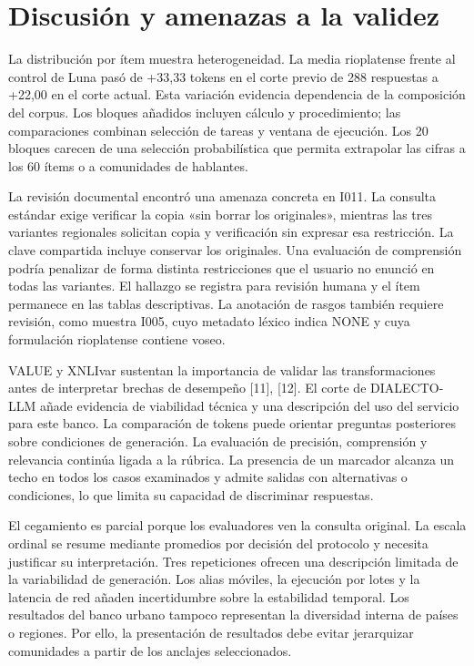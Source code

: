 \documentclass[conference]{IEEEtran}
\begin{document}
\section{Discusión y amenazas a la validez}
La distribución por ítem muestra heterogeneidad. La media rioplatense frente al control de Luna pasó de +33,33 tokens en el corte previo de 288 respuestas a +22,00 en el corte actual. Esta variación evidencia dependencia de la composición del corpus. Los bloques añadidos incluyen cálculo y procedimiento; las comparaciones combinan selección de tareas y ventana de ejecución. Los 20 bloques carecen de una selección probabilística que permita extrapolar las cifras a los 60 ítems o a comunidades de hablantes.

La revisión documental encontró una amenaza concreta en I011. La consulta estándar exige verificar la copia «sin borrar los originales», mientras las tres variantes regionales solicitan copia y verificación sin expresar esa restricción. La clave compartida incluye conservar los originales. Una evaluación de comprensión podría penalizar de forma distinta restricciones que el usuario no enunció en todas las variantes. El hallazgo se registra para revisión humana y el ítem permanece en las tablas descriptivas. La anotación de rasgos también requiere revisión, como muestra I005, cuyo metadato léxico indica NONE y cuya formulación rioplatense contiene voseo.

VALUE y XNLIvar sustentan la importancia de validar las transformaciones antes de interpretar brechas de desempeño [11], [12]. El corte de DIALECTO-LLM añade evidencia de viabilidad técnica y una descripción del uso del servicio para este banco. La comparación de tokens puede orientar preguntas posteriores sobre condiciones de generación. La evaluación de precisión, comprensión y relevancia continúa ligada a la rúbrica. La presencia de un marcador alcanza un techo en todos los casos examinados y admite salidas con alternativas o condiciones, lo que limita su capacidad de discriminar respuestas.

El cegamiento es parcial porque los evaluadores ven la consulta original. La escala ordinal se resume mediante promedios por decisión del protocolo y necesita justificar su interpretación. Tres repeticiones ofrecen una descripción limitada de la variabilidad de generación. Los alias móviles, la ejecución por lotes y la latencia de red añaden incertidumbre sobre la estabilidad temporal. Los resultados del banco urbano tampoco representan la diversidad interna de países o regiones. Por ello, la presentación de resultados debe evitar jerarquizar comunidades a partir de los anclajes seleccionados.
\end{document}
